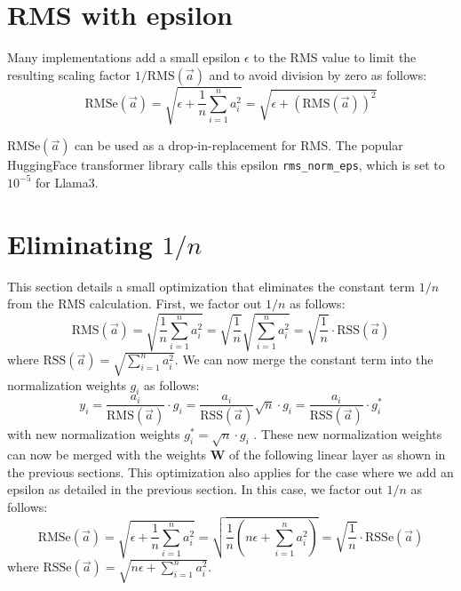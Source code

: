 \documentclass{article}
\newcommand{\mat}[1]{\mathbf{#1}}     %
\def\rms{\text{RMS}(\vec{a})}         %
\def\f1n{\frac{1}{n}}                 %
\def\sas{\sum_{i=1}^n a_i^2}           %
\def\a{\vec{a}}                       %
\begin{document}
\appendix

\section{RMS with epsilon}
Many implementations add a small epsilon $\epsilon$ to the RMS value to limit the resulting scaling factor $1/\rms$ and to avoid division by zero as follows:
\begin{equation*}
 \text{RMSe}(\a) = \sqrt{\epsilon + \f1n \sas} = \sqrt{\epsilon + \left( \rms \right)^2}
\end{equation*}

$\text{RMSe}(\a)$ can be used as a drop-in-replacement for RMS. The popular HuggingFace transformer library calls this epsilon \verb+rms_norm_eps+, which is set to $10^{-5}$ for Llama3.

\section{Eliminating $1/n$}
This section details a small optimization that eliminates the constant term $1/n$ from the RMS calculation. First, we factor out $1/n$ as follows:
\begin{equation*}
  \rms = \sqrt{\f1n \sas} = \sqrt{\f1n} \sqrt{\sas} = \sqrt{\f1n} \cdot \text{RSS}(\a)
\end{equation*}
where $\text{RSS}(\a) = \sqrt{\sas}$. We can now merge the constant term into the normalization weights $g_i$ as follows:
\begin{equation*}
  y_i = \frac{a_i}{\rms} \cdot g_i =
  \frac{a_i}{\text{RSS}(\a)} \sqrt{n} \cdot g_i =
  \frac{a_i}{\text{RSS}(\a)}          \cdot g_i^\ast
\end{equation*}
with new normalization weights $g_i^\ast = \sqrt{n} \cdot g_i$ . These new normalization weights can now be merged with the weights $\mat{W}$ of the following linear layer as shown in the previous sections. This optimization also applies for the case where we add an epsilon as detailed in the previous section. In this case, we factor out $1/n$ as follows:
\begin{equation*}
  \text{RMSe}(\a) = \sqrt{\epsilon + \f1n \sas}
  = \sqrt{\f1n \left( n \epsilon + \sas \right)}
  = \sqrt{\f1n} \cdot \text{RSSe}(\a)
\end{equation*}
where $\text{RSSe}(\a) = \sqrt{n \epsilon + \sas}$.



\end{document}
